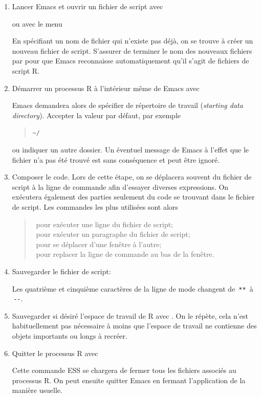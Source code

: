 \begin{enumerate}
\item Lancer Emacs et ouvrir un fichier de script avec
  \begin{quote}
  \end{quote}
  ou avec le menu
  \begin{quote}
  \end{quote}
  En spécifiant un nom de fichier qui n'existe pas déjà, on se trouve
  à créer un nouveau fichier de script. S'assurer de terminer le nom
  des nouveaux fichiers par  pour que Emacs reconnaisse
  automatiquement qu'il s'agit de fichiers de script R.
\item Démarrer un processus R à l'intérieur même de Emacs avec
  \begin{quote}
    \returnkey
  \end{quote}
  Emacs demandera alors de spécifier de répertoire de travail
  (\emph{starting data directory}). Accepter la valeur par défaut, par
  exemple
  \begin{quote}
    \verb=~/ =\returnkey
  \end{quote}
  ou indiquer un autre dossier. Un éventuel message de Emacs à l'effet
  que le fichier  n'a pas été trouvé est sans
  conséquence et peut être ignoré.
\item Composer le code. Lors de cette étape, on se déplacera souvent
  du fichier de script à la ligne de commande afin d'essayer diverses
  expressions. On exécutera également des parties seulement du code se
  trouvant dans le fichier de script. Les commandes les plus utilisées
  sont alors
  \begin{quote}
    \ pour exécuter une ligne du fichier de script; \\
    \ pour exécuter un paragraphe du fichier de script; \\
    \ pour se déplacer d'une fenêtre à l'autre; \\
    \ pour replacer la ligne de commande au bas de la
    fenêtre.
  \end{quote}
\item Sauvegarder le fichier de script:
  \begin{quote}
  \end{quote}
  Les quatrième et cinquième caractères de la ligne de mode changent
  de \,\verb|**|\, à \,\verb|--|.
\item Sauvegarder si désiré l'espace de travail de R avec
  . On le répète, cela
  n'est habituellement pas nécessaire à moins que l'espace de travail
  ne contienne des objets importants ou longs à recréer.
\item Quitter le processus R avec
  \begin{quote}
  \end{quote}
  Cette commande ESS se chargera de fermer tous les fichiers associés
  au processus R. On peut ensuite quitter Emacs en fermant
  l'application de la manière usuelle.
\end{enumerate}



